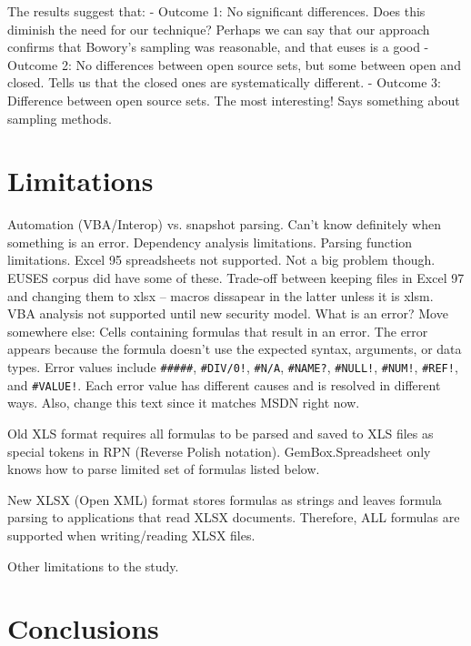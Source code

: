 \documentclass[conference]{IEEEtran}
\begin{document}
The results suggest that:
- Outcome 1: No significant differences. Does this diminish the need for our technique?
  Perhaps we can say that our approach confirms that Bowory's sampling was reasonable,
  and that euses is a good 
- Outcome 2: No differences between open source sets, but some between open and closed. 
  Tells us that the closed ones are systematically different.
- Outcome 3: Difference between open source sets. The most interesting! Says something about 
  sampling methods.


\section{Limitations}

Automation (VBA/Interop) vs. snapshot parsing. Can't know definitely when
something is an error.
%
Dependency analysis limitations.
%
Parsing function limitations.
%
Excel 95 spreadsheets not supported. Not a big problem though. EUSES corpus did have some of these. Trade-off between keeping files in Excel 97 and changing them to xlsx -- macros dissapear in the latter unless it is xlsm.
%
VBA analysis not supported until new security model.
%
What is an error? Move somewhere else: Cells containing formulas that result in an error. The error appears because the formula doesn't use the expected syntax, arguments, or data types. Error values include \texttt{\#\#\#\#\#}, \texttt{\#DIV/0!}, \texttt{\#N/A}, \texttt{\#NAME?}, \texttt{\#NULL!}, \texttt{\#NUM!}, \texttt{\#REF!}, and \texttt{\#VALUE!}. Each error value has different causes and is resolved in different ways. Also, change this text since it matches MSDN right now.

Old XLS format requires all formulas to be parsed and saved to XLS files as special tokens in RPN (Reverse Polish notation). GemBox.Spreadsheet only knows how to parse limited set of formulas listed below.

New XLSX (Open XML) format stores formulas as strings and leaves formula parsing to applications that read XLSX documents. Therefore, ALL formulas are supported when writing/reading XLSX files.

Other limitations to the study.

\section{Conclusions}
\end{document}
